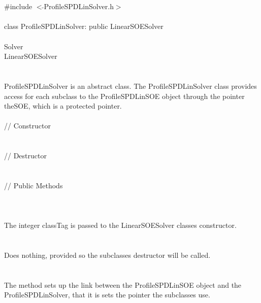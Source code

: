 
 \\

   \\
\indent \#include $<\tilde{ }$ProfileSPDLinSolver.h$>$  \\

  \\
\indent class ProfileSPDLinSolver: public LinearSOESolver  \\

 \\
\indent  Solver \\
\indent\indent LinearSOESolver \\
\indent\indent{} \\

  \\
\indent ProfileSPDLinSolver is an abstract class.  The ProfileSPDLinSolver
class provides access for each subclass to the ProfileSPDLinSOE object
through the pointer \p theSOE, which is a protected pointer. \\

  \\
\indent\indent // Constructor \\
\indent{}  \\ \\
\indent\indent // Destructor \\
\indent{}\\  \\
\indent\indent // Public Methods \\
\indent{} \\

  \\
  \\
The integer \p classTag is passed to the LinearSOESolver classes
constructor. \\ 

 \\
\\ 
Does nothing, provided so the subclasses destructor will be called. \\

  \\
 \\
The method sets up the link between the ProfileSPDLinSOE object and the
ProfileSPDLinSolver, that it is sets the pointer the subclasses use.  \\
